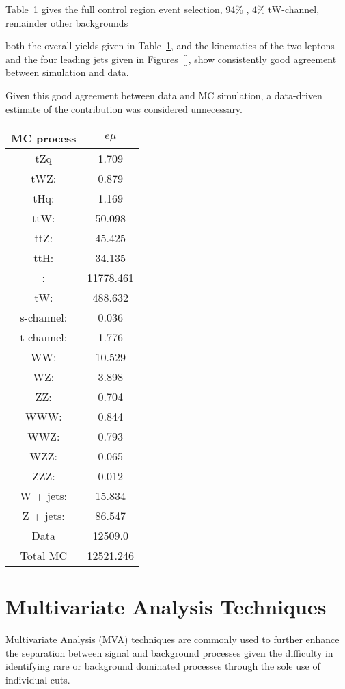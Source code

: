 Table~\ref{tab:ttbarCR} gives  the full control region event selection, 
94\% \ttbar, 4\% tW-channel, remainder other backgrounds

both the overall yields given in Table~\ref{tab:ttbarCR}, and the kinematics of the two leptons and the four leading jets given in Figures~\ref{}, show consistently good agreement between simulation and data.

Given this good agreement between data and MC simulation, a data-driven estimate of the \ttbar contribution was considered unnecessary.

\begin{table}[htbp]
\label{tab:ttbarCR}
  \centering
 \begin{tabular}{cc}
   \hline
   \textbf{MC process} & \textbf{$e\mu$}  \\
   \hline
	tZq & 1.709  \\
	tWZ\@: & 0.879  \\
	tHq: & 1.169  \\
	ttW\@: & 50.098   \\
	ttZ\@: & 45.425   \\
	ttH\@: & 34.135  \\
	\ttbar: & 11778.461   \\
	tW\@: & 488.632    \\
	s-channel: &  0.036 \\
	t-channel: & 1.776 \\
	WW\@: & 10.529  \\
	WZ\@: & 3.898 \\
	ZZ\@: & 0.704 \\
	WWW\@: & 0.844     \\
	WWZ\@: & 0.793     \\
	WZZ\@: & 0.065     \\
	ZZZ\@: & 0.012     \\
	W + jets: & 15.834     \\
	Z + jets: & 86.547     \\
	\hline
	Data & 12509.0    \\
	Total MC & 12521.246     \\
   \hline
 \end{tabular}
\end{table}



\section{Multivariate Analysis Techniques}\label{sec:mvas}
Multivariate Analysis (MVA) techniques are commonly used to further enhance the separation between signal and background processes given the difficulty in identifying rare or background dominated processes through the sole use of individual cuts.

